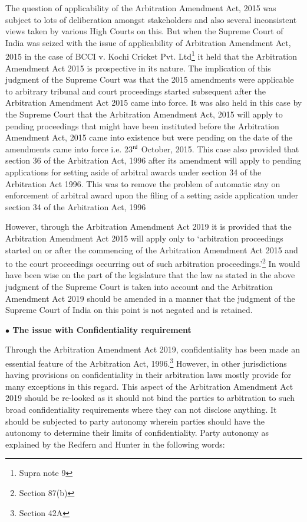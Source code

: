\begin{multicols}{2}
\noi
The question of applicability of the Arbitration Amendment Act, 2015 was subject to lots of
deliberation amongst stakeholders and also several inconsistent views taken by various High
Courts on this. But when the Supreme Court of India was seized with the issue of
applicability of Arbitration Amendment Act, 2015 in the case of BCCI v. Kochi Cricket Pvt.
Ltd\footnote{Supra note 9} it held that the Arbitration Amendment Act 2015 is prospective in its nature. The
implication of this judgment of the Supreme Court was that the 2015 amendments were
applicable to arbitrary tribunal and court proceedings started subsequent after the Arbitration
Amendment Act 2015 came into force. It was also held in this case by the Supreme Court
that the Arbitration Amendment Act, 2015 will apply to pending proceedings that might have
been instituted before the Arbitration Amendment Act, 2015 came into existence but were
pending on the date of the amendments came into force i.e. 23$^{\rm rd}$ October, 2015. This case also
provided that section 36 of the Arbitration Act, 1996 after its amendment will apply to
pending applications for setting aside of arbitral awards under section 34 of the Arbitration
Act 1996. This was to remove the problem of automatic stay on enforcement of arbitral
award upon the filing of a setting aside application under section 34 of the Arbitration Act,
1996

\noi
However, through the Arbitration Amendment Act 2019 it is provided that the Arbitration
Amendment Act 2015 will apply only to ‘arbitration proceedings started on or after the
commencing of the Arbitration Amendment Act 2015 and to the court proceedings occurring
out of such arbitration proceedings.’\footnote{Section 87(b)} In would have been wise on the part of the legislature
that the law as stated in the above judgment of the Supreme Court is taken into account and
the Arbitration Amendment Act 2019 should be amended in a manner that the judgment of
the Supreme Court of India on this point is not negated and is retained.

\noi
{\large \bfseries $\bullet$ The issue with Confidentiality requirement}

\noi
Through the Arbitration Amendment Act 2019, confidentiality has been made an essential
feature of the Arbitration Act, 1996.\footnote{Section 42A} However, in other jurisdictions having provisions on
confidentiality in their arbitration laws mostly provide for many exceptions in this regard.
This aspect of the Arbitration Amendment Act 2019 should be re-looked as it should not bind 
the parties to arbitration to such broad confidentiality requirements where they can not
disclose anything. It should be subjected to party autonomy wherein parties should have the
autonomy to determine their limits of confidentiality. Party autonomy as explained by the
Redfern and Hunter in the following words:


\end{multicols}
